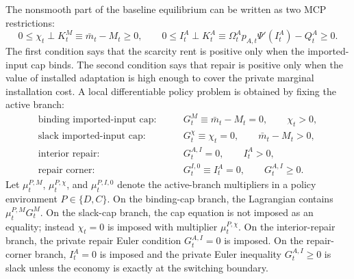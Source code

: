 ﻿\documentclass[12pt]{article}
\theoremstyle{remark}
\begin{document}
The nonsmooth part of the baseline equilibrium can be written as two MCP restrictions:
\begin{equation}
    0\le \chi_t
    \perp
    K_t^M\equiv \bar m_t-M_t\ge0,
    \qquad
    0\le I_t^A
    \perp
    K_t^A\equiv \Omega_t^Ap_{A,t}\Psi'(I_t^A)-Q_t^A\ge0.
    \label{eq:app_mcp}
\end{equation}
The first condition says that the scarcity rent is positive only when the imported-input cap binds.
The second condition says that repair is positive only when the value of installed adaptation is high
enough to cover the private marginal installation cost. A local differentiable policy problem is
obtained by fixing the active branch:
\begin{align}
    \text{binding imported-input cap:}
    \qquad
    &G_t^M\equiv \bar m_t-M_t=0,
    \qquad
    \chi_t>0,
    \label{eq:app_binding_cap_branch}\\
    \text{slack imported-input cap:}
    \qquad
    &G_t^\chi\equiv \chi_t=0,
    \qquad
    \bar m_t-M_t>0,
    \label{eq:app_slack_cap_branch}\\
    \text{interior repair:}
    \qquad
    &G_t^{A,I}=0,
    \qquad
    I_t^A>0,
    \label{eq:app_interior_repair_branch}\\
    \text{repair corner:}
    \qquad
    &G_t^{I,0}\equiv I_t^A=0,
    \qquad
    G_t^{A,I}\ge0.
    \label{eq:app_corner_repair_branch}
\end{align}
Let $\mu_t^{P,M}$, $\mu_t^{P,\chi}$, and $\mu_t^{P,I,0}$ denote the active-branch multipliers in a
policy environment $P\in\{D,C\}$. On the binding-cap branch, the Lagrangian contains
$\mu_t^{P,M}G_t^M$. On the slack-cap branch, the cap equation is not imposed as an equality; instead
$\chi_t=0$ is imposed with multiplier $\mu_t^{P,\chi}$. On the interior-repair branch, the private
repair Euler condition $G_t^{A,I}=0$ is imposed. On the repair-corner branch, $I_t^A=0$ is imposed
and the private Euler inequality $G_t^{A,I}\ge0$ is slack unless the economy is exactly at the
switching boundary.
\end{document}
